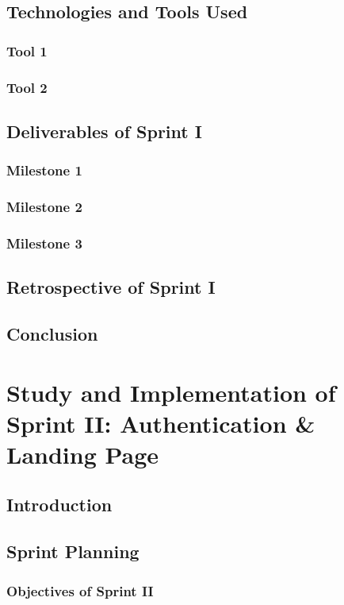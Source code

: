 \documentclass[a4paper,12pt]{report}
\begin{document}
\section{Technologies and Tools Used}
\subsection{Tool 1}
\subsection{Tool 2}
\section{Deliverables of Sprint I}
\subsection{Milestone 1}
\subsection{Milestone 2}
\subsection{Milestone 3}
\section{Retrospective of Sprint I}
\section{Conclusion}

\chapter[Sprint II]{Study and Implementation of Sprint II: Authentication \& Landing Page}

\minitoc
\section{Introduction}
\section{Sprint Planning}
\subsection{Objectives of Sprint II}
\end{document}
